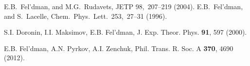 \begin{thebibliography}{}
%
%
%
E.B.~Fel’dman, and M.G.~Rudavets, JETP 98,~207–219 (2004).
%
E.B.~Fel’dman, and S.~Lacelle, Chem.~Phys.~Lett.~253,~27–31 (1996).
%
%
%
%
%
%


  S.I. Doronin, I.I. Maksimov, E.B. Fel'dman, J. Exp. Theor. Phys. {\bf 91}, 597 (2000).

 E.B. Fel'dman, A.N. Pyrkov, A.I. Zenchuk, Phil. Trans. R. Soc. A {\bf 370}, 4690 (2012).

\end{thebibliography}
